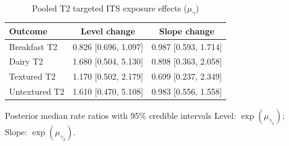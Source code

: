 \begin{table}[H]
\centering
\caption{Pooled T2 targeted ITS exposure effects ($\mu_\gamma$)}
\label{tab:a4_t2_mu_gamma}
\begin{tabular}{lcc}
\toprule
Outcome & Level change & Slope change \\
\midrule
Breakfast T2 & 0.826 [0.696, 1.097] & 0.987 [0.593, 1.714] \\
Dairy T2 & 1.680 [0.504, 5.130] & 0.898 [0.363, 2.058] \\
Textured T2 & 1.170 [0.502, 2.179] & 0.699 [0.237, 2.349] \\
Untextured T2 & 1.610 [0.470, 5.108] & 0.983 [0.556, 1.558] \\
\bottomrule
\end{tabular}
\par\smallskip\footnotesize Posterior median rate ratios with 95\% credible intervals Level: $\exp(\mu_{\gamma_1})$; Slope: $\exp(\mu_{\gamma_2})$.
\end{table}
